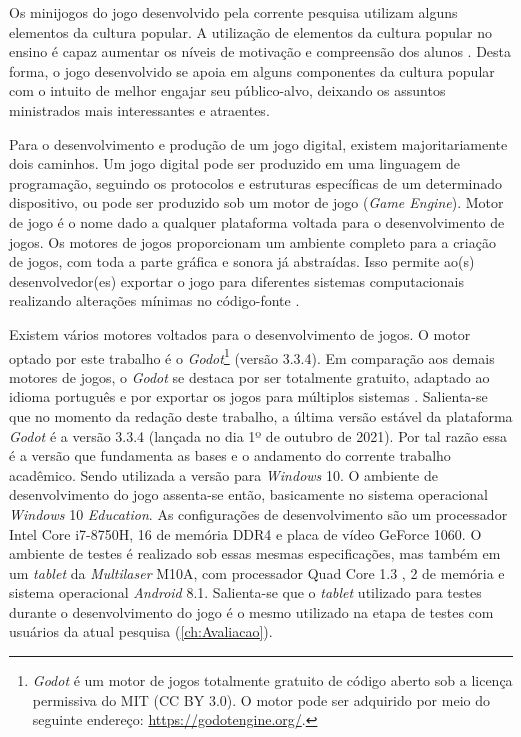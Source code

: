 Os minijogos do jogo desenvolvido pela corrente pesquisa utilizam alguns elementos da cultura popular. A utilização de elementos da cultura popular no ensino é capaz aumentar os níveis de motivação e compreensão dos alunos \cite{giroux1988schooling, cheung2001use, duncan2004your, chik2011learner}. Desta forma, o jogo desenvolvido se apoia em alguns componentes da cultura popular com o intuito de melhor engajar seu público-alvo, deixando os assuntos ministrados mais interessantes e atraentes. 

Para o desenvolvimento e produção de um jogo digital, existem majoritariamente dois caminhos. Um jogo digital pode ser produzido em uma linguagem de programação, seguindo os protocolos e estruturas específicas de um determinado dispositivo, ou pode ser produzido sob um motor de jogo (\textit{Game Engine}). Motor de jogo é o nome dado a qualquer plataforma voltada para o desenvolvimento de jogos. Os motores de jogos proporcionam um ambiente completo para a criação de jogos, com toda a parte gráfica e sonora já abstraídas. Isso permite ao(s) desenvolvedor(es) exportar o jogo para diferentes sistemas computacionais realizando alterações mínimas no código-fonte \cite{bishop1998designing, machado2009serious}.

Existem vários motores voltados para o desenvolvimento de jogos. O motor optado por este trabalho é o \textit{Godot}\footnote{\textit{Godot} é um motor de jogos totalmente gratuito de código aberto sob a licença permissiva do MIT (CC BY 3.0). O motor pode ser adquirido por meio do seguinte endereço: \url{https://godotengine.org/}.} (versão 3.3.4). Em comparação aos demais motores de jogos, o \textit{Godot} se destaca por ser totalmente gratuito, adaptado ao idioma português e por exportar os jogos para múltiplos sistemas \cite{scherer2020analise}. Salienta-se que no momento da redação deste trabalho, a última versão estável da plataforma \textit{Godot} é a versão 3.3.4 (lançada no dia 1º de outubro de 2021). Por tal razão essa é a versão que fundamenta as bases e o andamento do corrente trabalho acadêmico. Sendo utilizada a versão para \textit{Windows} 10. O ambiente de desenvolvimento do jogo assenta-se então, basicamente no sistema operacional \textit{Windows} 10 \textit{Education}. As configurações de desenvolvimento são um processador Intel\textregistered\textbf{ }Core\texttrademark\textbf{ }i7-8750H, 16  de memória  DDR4 e placa de vídeo GeForce  1060. O ambiente de testes é realizado sob essas mesmas especificações, mas também em um \textit{tablet} da \textit{Multilaser} M10A, com processador Quad Core 1.3 , 2  de memória  e sistema operacional \textit{Android} 8.1. Salienta-se que o \textit{tablet} utilizado para testes durante o desenvolvimento do jogo é o mesmo utilizado na etapa de testes com usuários da atual pesquisa (\autoref{ch:Avaliacao}).

